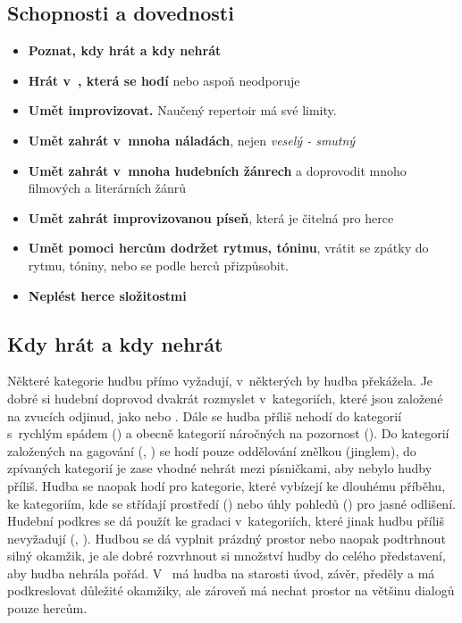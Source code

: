\subsection{Schopnosti a dovednosti} \begin{itemize}
\item \textbf{Poznat, kdy hrát a kdy nehrát}
\item \textbf{Hrát v~, která se hodí} nebo aspoň neodporuje
\item \textbf{Umět improvizovat.} Naučený repertoir má své limity.
\item \textbf{Umět zahrát v~mnoha náladách}, nejen \textit{veselý - smutný}
\item \textbf{Umět zahrát v~mnoha hudebních žánrech} a doprovodit mnoho filmových a literárních žánrů
\item \textbf{Umět zahrát improvizovanou píseň}, která je čitelná pro herce
\item \textbf{Umět pomoci hercům dodržet rytmus, tóninu}, vrátit se zpátky do rytmu, tóniny, nebo se podle herců přizpůsobit.
\item \textbf{Neplést herce složitostmi}
\end{itemize}
 
\subsection{Kdy hrát a kdy nehrát} Některé kategorie hudbu přímo vyžadují, v~některých by hudba překážela. Je dobré si hudební doprovod dvakrát rozmyslet v~kategoriích, které jsou založené na zvucích odjinud, jako  nebo . Dále se hudba příliš nehodí do kategorií s~rychlým spádem () a obecně kategorií náročných na pozornost (). Do kategorií založených na gagování (, ) se hodí pouze oddělování znělkou (jinglem), do zpívaných kategorií je zase vhodné nehrát mezi písničkami, aby nebylo hudby příliš. Hudba se naopak hodí pro kategorie, které vybízejí ke dlouhému příběhu, ke kategoriím, kde se střídají prostředí () nebo úhly pohledů () pro jasné odlišení. Hudební podkres se dá použít ke gradaci v~kategoriích, které jinak hudbu příliš nevyžadují (, ). Hudbou se dá vyplnit prázdný prostor nebo naopak podtrhnout silný okamžik, je ale dobré rozvrhnout si množství hudby do celého představení, aby hudba nehrála pořád. V~ má hudba na starosti úvod, závěr, předěly a má podkreslovat důležité okamžiky, ale zároveň má nechat prostor na většinu dialogů pouze hercům.  
 
